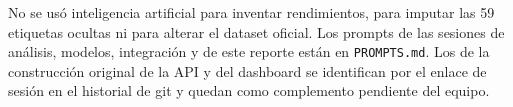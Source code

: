 \noindent No se usó inteligencia artificial para inventar rendimientos, para imputar las 59 etiquetas ocultas ni para alterar el dataset oficial. Los prompts de las sesiones de análisis, modelos, integración y de este reporte están en \texttt{PROMPTS.md}. Los de la construcción original de la API y del dashboard se identifican por el enlace de sesión en el historial de git y quedan como complemento pendiente del equipo.
